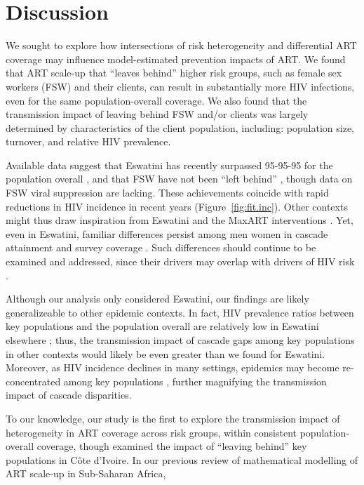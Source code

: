 \section{Discussion}\label{art.disc}
We sought to explore how intersections of risk heterogeneity and differential ART coverage
may influence model-estimated prevention impacts of ART.
We found that ART scale-up that ``leaves behind'' higher risk groups,
such as female sex workers (FSW) and their clients,
can result in substantially more HIV infections,
even for the same population-overall coverage.
We also found that the transmission impact of
leaving behind FSW and/or clients was largely determined by
characteristics of the client population, including:
population size, turnover, and relative HIV prevalence.
\par
Available data suggest that
Eswatini has recently surpassed 95-95-95 for the population overall \cite{SHIMS3},
and that FSW have not been ``left behind'' \cite{EswIBBS2022},
though data on FSW viral suppression are lacking.
These achievements coincide with rapid reductions in HIV incidence in recent years
\cite{SHIMS1,SHIMS2,SHIMS3} (Figure~\ref{fig:fit.inc}).
Other contexts might thus draw inspiration from
Eswatini and the MaxART interventions \cite{Walsh2020}.
Yet, even in Eswatini, familiar differences persist among men \vs women
in cascade attainment and survey coverage \cite{SHIMS1,SHIMS2,SHIMS3}.
Such differences should continue to be examined and addressed,
since their drivers may overlap with drivers of HIV risk \cite{Akullian2017,Camlin2019}.
\par
Although our analysis only considered Eswatini,
our findings are likely generalizeable to other epidemic contexts.
In fact, HIV prevalence ratios between key populations and the population overall
are relatively low in Eswatini \vs elsewhere \cite{Baral2012,Hessou2019};
thus, the transmission impact of cascade gaps among key populations in other contexts
would likely be even greater than we found for Eswatini.
Moreover, as HIV incidence declines in many settings,
epidemics may become re-concentrated among key populations \cite{Brown2019,Garnett2021},
further magnifying the transmission impact of cascade disparities.
\par
To our knowledge, our study is the first to explore the transmission impact of
heterogeneity in ART coverage across risk groups,
within consistent population-overall coverage,
though \citet{Maheu-Giroux2017art} examined the impact of
``leaving behind'' key populations in C\^{o}te d'Ivoire.
In our previous review of mathematical modelling of ART scale-up in Sub-Saharan Africa,
